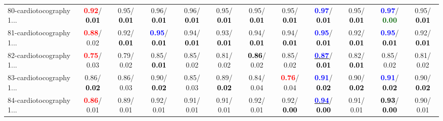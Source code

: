 \begin{table}[h]
\begin{center}
{\begin{tabular}{lc|c|c|c|c|c|c|c|c|c|c}
80-cardiotocography 1... & \textcolor{red}{\textbf{  0.92}}/\textcolor{black}{\textbf{  0.01}} &   0.95/\textcolor{black}{\textbf{  0.01}} &   0.96/\textcolor{black}{\textbf{  0.01}} &   0.96/\textcolor{black}{\textbf{  0.01}} &   0.95/\textcolor{black}{\textbf{  0.01}} &   0.95/\textcolor{black}{\textbf{  0.01}} &   0.95/\textcolor{black}{\textbf{  0.01}} & \textcolor{blue}{\textbf{  0.97}}/\textcolor{black}{\textbf{  0.01}} &   0.95/\textcolor{black}{\textbf{  0.01}} & \textcolor{blue}{\textbf{  0.97}}/\textcolor{darkgreen}{\textbf{  0.00}} &   0.95/\textcolor{black}{\textbf{  0.01}} \\
81-cardiotocography 1... & \textcolor{red}{\textbf{  0.88}}/  0.02 &   0.92/\textcolor{black}{\textbf{  0.01}} & \textcolor{blue}{\textbf{  0.95}}/\textcolor{black}{\textbf{  0.01}} &   0.94/\textcolor{black}{\textbf{  0.01}} &   0.93/\textcolor{black}{\textbf{  0.01}} &   0.94/\textcolor{black}{\textbf{  0.01}} &   0.94/\textcolor{black}{\textbf{  0.01}} & \textcolor{blue}{\textbf{  0.95}}/\textcolor{black}{\textbf{  0.01}} &   0.92/\textcolor{black}{\textbf{  0.01}} & \textcolor{blue}{\textbf{  0.95}}/\textcolor{black}{\textbf{  0.01}} &   0.92/\textcolor{black}{\textbf{  0.01}} \\
82-cardiotocography 1... & \textcolor{red}{\textbf{  0.75}}/  0.03 &   0.79/  0.02 &   0.85/\textcolor{black}{\textbf{  0.01}} &   0.85/  0.02 &   0.81/  0.02 & \textcolor{black}{\textbf{  0.86}}/  0.02 &   0.85/  0.02 & \underline{\textcolor{blue}{\textbf{  0.87}}}/\textcolor{black}{\textbf{  0.01}} &   0.82/\textcolor{black}{\textbf{  0.01}} &   0.85/  0.02 &   0.81/  0.02 \\
83-cardiotocography 1... &   0.86/\textcolor{black}{\textbf{  0.02}} &   0.86/  0.03 &   0.90/\textcolor{black}{\textbf{  0.02}} &   0.85/  0.03 &   0.89/\textcolor{black}{\textbf{  0.02}} &   0.84/  0.04 & \textcolor{red}{\textbf{  0.76}}/  0.04 & \textcolor{blue}{\textbf{  0.91}}/\textcolor{black}{\textbf{  0.02}} &   0.90/\textcolor{black}{\textbf{  0.02}} & \textcolor{blue}{\textbf{  0.91}}/\textcolor{black}{\textbf{  0.02}} &   0.90/\textcolor{black}{\textbf{  0.02}} \\
84-cardiotocography 1... & \textcolor{red}{\textbf{  0.86}}/  0.01 &   0.89/  0.01 &   0.92/  0.01 &   0.91/  0.01 &   0.91/  0.01 &   0.92/  0.01 &   0.92/\textcolor{black}{\textbf{  0.00}} & \underline{\textcolor{blue}{\textbf{  0.94}}}/\textcolor{black}{\textbf{  0.00}} &   0.91/  0.01 & \textcolor{black}{\textbf{  0.93}}/\textcolor{black}{\textbf{  0.00}} &   0.90/  0.01 \\

\end{tabular}}
\end{center}
\end{table}
